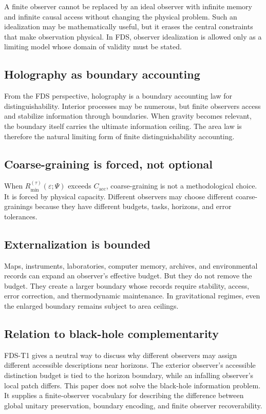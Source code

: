 \documentclass[10pt,a4paper,twocolumn,aps,prl]{revtex4-2}
\begin{document}
A finite observer cannot be replaced by an ideal observer with infinite memory and infinite causal access without changing the physical problem. Such an idealization may be mathematically useful, but it erases the central constraints that make observation physical. In FDS, observer idealization is allowed only as a limiting model whose domain of validity must be stated.

\subsection{Holography as boundary accounting}

From the FDS perspective, holography is a boundary accounting law for distinguishability. Interior processes may be numerous, but finite observers access and stabilize information through boundaries. When gravity becomes relevant, the boundary itself carries the ultimate information ceiling. The area law is therefore the natural limiting form of finite distinguishability accounting.

\subsection{Coarse-graining is forced, not optional}

When $R_{\min}^{(\tau)}(\varepsilon;\Psi)$ exceeds $C_{\mathrm{acc}}$, coarse-graining is not a methodological choice. It is forced by physical capacity. Different observers may choose different coarse-grainings because they have different budgets, tasks, horizons, and error tolerances.

\subsection{Externalization is bounded}

Maps, instruments, laboratories, computer memory, archives, and environmental records can expand an observer's effective budget. But they do not remove the budget. They create a larger boundary whose records require stability, access, error correction, and thermodynamic maintenance. In gravitational regimes, even the enlarged boundary remains subject to area ceilings.

\subsection{Relation to black-hole complementarity}

FDS-T1 gives a neutral way to discuss why different observers may assign different accessible descriptions near horizons. The exterior observer's accessible distinction budget is tied to the horizon boundary, while an infalling observer's local patch differs. This paper does not solve the black-hole information problem. It supplies a finite-observer vocabulary for describing the difference between global unitary preservation, boundary encoding, and finite observer recoverability.
\end{document}
